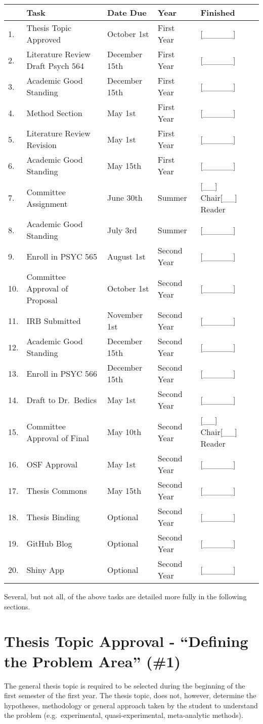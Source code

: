 \documentclass[]{book}
\begin{document}
\begin{longtable}[]{@{}lllll@{}}
\toprule
& Task & Date Due & Year & Finished\tabularnewline
\midrule
\endhead
1. & Thesis Topic Approved & October 1st & First Year & {[}\_\_\_\_\_{]}\tabularnewline
2. & Literature Review Draft Psych 564 & December 15th & First Year & {[}\_\_\_\_\_{]}\tabularnewline
3. & Academic Good Standing & December 15th & First Year & {[}\_\_\_\_\_{]}\tabularnewline
4. & Method Section & May 1st & First Year & {[}\_\_\_\_\_{]}\tabularnewline
5. & Literature Review Revision & May 1st & First Year & {[}\_\_\_\_\_{]}\tabularnewline
6. & Academic Good Standing & May 15th & First Year & {[}\_\_\_\_\_{]}\tabularnewline
7. & Committee Assignment & June 30th & Summer & {[}\_\_{]} Chair{[}\_\_{]} Reader\tabularnewline
8. & Academic Good Standing & July 3rd & Summer & {[}\_\_\_\_\_{]}\tabularnewline
9. & Enroll in PSYC 565 & August 1st & Second Year & {[}\_\_\_\_\_{]}\tabularnewline
10. & Committee Approval of Proposal & October 1st & Second Year & {[}\_\_\_\_\_{]}\tabularnewline
11. & IRB Submitted & November 1st & Second Year & {[}\_\_\_\_\_{]}\tabularnewline
12. & Academic Good Standing & December 15th & Second Year & {[}\_\_\_\_\_{]}\tabularnewline
13. & Enroll in PSYC 566 & December 15th & Second Year & {[}\_\_\_\_\_{]}\tabularnewline
14. & Draft to Dr.~Bedics & May 1st & Second Year & {[}\_\_\_\_\_{]}\tabularnewline
15. & Committee Approval of Final & May 10th & Second Year & {[}\_\_{]} Chair{[}\_\_{]} Reader\tabularnewline
16. & OSF Approval & May 1st & Second Year & {[}\_\_\_\_\_{]}\tabularnewline
17. & Thesis Commons & May 15th & Second Year & {[}\_\_\_\_\_{]}\tabularnewline
18. & Thesis Binding & Optional & Second Year & {[}\_\_\_\_\_{]}\tabularnewline
19. & GitHub Blog & Optional & Second Year & {[}\_\_\_\_\_{]}\tabularnewline
20. & Shiny App & Optional & Second Year & {[}\_\_\_\_\_{]}\tabularnewline
\bottomrule
\end{longtable}

Several, but not all, of the above tasks are detailed more fully in the following sections.

\hypertarget{thesis-topic-approval---defining-the-problem-area-1}{%
\section{Thesis Topic Approval - ``Defining the Problem Area'' (\#1)}\label{thesis-topic-approval---defining-the-problem-area-1}}

The general thesis topic is required to be selected during the beginning of the first semester of the first year. The thesis topic, does not, however, determine the hypotheses, methodology or general approach taken by the student to understand the problem (e.g.~experimental, quasi-experimental, meta-analytic methods).
\end{document}
